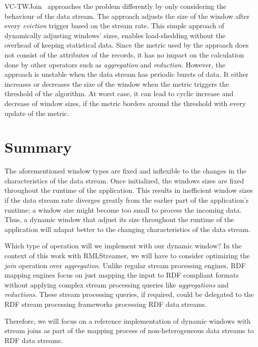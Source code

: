 VC-TWJoin~\cite{vctw_join} approaches the problem differently by only considering 
the behaviour of the data stream. The approach adjusts the size of the window 
after every \emph{eviction} trigger based on the stream rate. This simple approach 
of dynamically adjusting windows' sizes, enables load-shedding without the overhead of 
keeping statistical data. Since the metric used by the approach does not consist 
of the attributes of the records, it has no impact on the calculation 
done by other operators such as \emph{aggregation} and \emph{reduction}.
However, the approach is unstable when the data stream has periodic bursts of data.
It either increases or decreases the size of the window when the metric triggers 
the threshold of the algorithm. At worst case, it can lead to cyclic increase and 
decrease of window sizes, if the metric borders around the threshold with every 
update of the metric.


\section{Summary}%
\label{sec:Summary}

The aforementioned window types are fixed and inflexible to the changes 
in the characteristics of the data stream. Once initialized, the windows sizes 
are fixed throughout the runtime of the application. This results in inefficient 
window sizes if the data stream rate diverges greatly from the earlier part of the 
application's runtime; a window size might become too small to process the incoming 
data. Thus, a dynamic window that adjust its size throughout the runtime of the application 
will adapat better to the changing characteristics of the data stream. 



Which type of operation will we implement with our dynamic window? 
In the context of this work with RMLStreamer, we will have to consider optimizing the 
\emph{join} operation over \emph{aggregation}. 
Unlike regular stream processing engines, RDF mapping engines focus 
on just mapping the input to RDF compliant formats without 
applying complex stream processing queries like \emph{aggregations} and 
\emph{reductions}. These stream processing queries, if required, could be 
delegated to the RDF stream processing frameworks processing RDF data streams.

Therefore, we will focus on a reference implementation of dynamic windows with 
stream joins as part of the mapping process of non-heterogeneous data streams 
to RDF data streams. 



